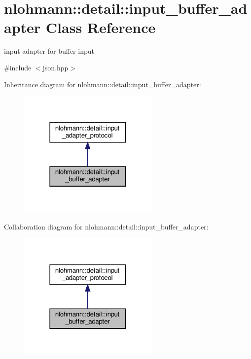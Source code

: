 \hypertarget{classnlohmann_1_1detail_1_1input__buffer__adapter}{}\section{nlohmann\+:\+:detail\+:\+:input\+\_\+buffer\+\_\+adapter Class Reference}
\label{classnlohmann_1_1detail_1_1input__buffer__adapter}


input adapter for buffer input  




{\ttfamily \#include $<$json.\+hpp$>$}



Inheritance diagram for nlohmann\+:\+:detail\+:\+:input\+\_\+buffer\+\_\+adapter\+:
\nopagebreak
\begin{figure}[H]
\begin{center}
\leavevmode
\includegraphics[width=195pt]{classnlohmann_1_1detail_1_1input__buffer__adapter__inherit__graph}
\end{center}
\end{figure}


Collaboration diagram for nlohmann\+:\+:detail\+:\+:input\+\_\+buffer\+\_\+adapter\+:
\nopagebreak
\begin{figure}[H]
\begin{center}
\leavevmode
\includegraphics[width=195pt]{classnlohmann_1_1detail_1_1input__buffer__adapter__coll__graph}
\end{center}
\end{figure}
